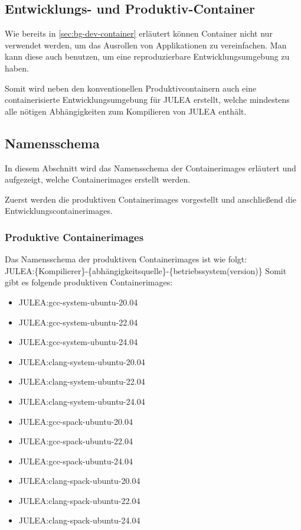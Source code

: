 \subsection{Entwicklungs- und Produktiv-Container}

Wie bereits in \cref{sec:bg-dev-container} erläutert können Container nicht nur verwendet werden, um das Ausrollen von Applikationen zu vereinfachen. Man kann diese auch benutzen, um eine reproduzierbare Entwicklungsumgebung zu haben. 

Somit wird neben den konventionellen Produktivcontainern auch eine containerisierte Entwicklungsumgebung für JULEA erstellt, welche mindestens alle nötigen Abhängigkeiten zum Kompilieren von JULEA enthält.

\subsection{Namensschema} \label{sec:namensschema}

In diesem Abschnitt wird das Namensschema der Containerimages erläutert und aufgezeigt, welche Containerimages erstellt werden. 

Zuerst werden die produktiven Containerimages vorgestellt und anschließend die Entwicklungscontainerimages. 

\subsubsection{Produktive Containerimages}

Das Namensschema der produktiven Containerimages ist wie folgt: \\
JULEA:\{Kompilierer\}-\{abhängigkeitsquelle\}-\{betriebssystem(version)\}
Somit gibt es folgende produktiven Containerimages:

\begin{multicols}{2}
    \begin{itemize}
        \item JULEA:gcc-system-ubuntu-20.04  
        \item JULEA:gcc-system-ubuntu-22.04  
        \item JULEA:gcc-system-ubuntu-24.04  
        \item JULEA:clang-system-ubuntu-20.04
        \item JULEA:clang-system-ubuntu-22.04
        \item JULEA:clang-system-ubuntu-24.04
        \item JULEA:gcc-spack-ubuntu-20.04   
        \item JULEA:gcc-spack-ubuntu-22.04   
        \item JULEA:gcc-spack-ubuntu-24.04   
        \item JULEA:clang-spack-ubuntu-20.04 
        \item JULEA:clang-spack-ubuntu-22.04 
        \item JULEA:clang-spack-ubuntu-24.04 
    \end{itemize} 
\end{multicols}

